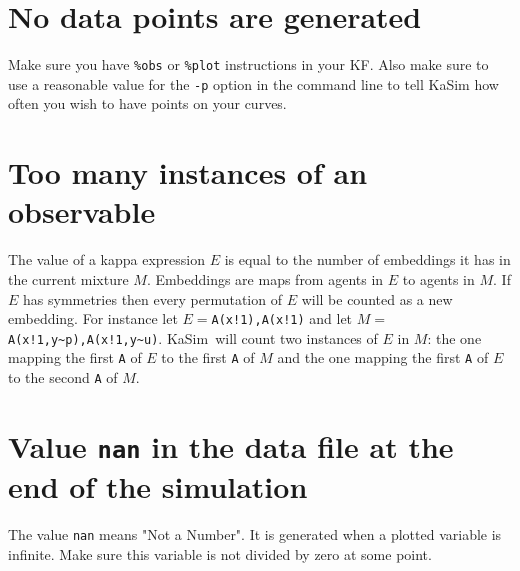 \documentclass[11pt]{book}
\def\KaSim{\textsf{KaSim}}
\def\intstate{\textasciitilde}
\def\ttt#1{\texttt{#1}}
\begin{document}
\section*{No data points are generated}
Make sure you have \ttt{\%obs} or \ttt{\%plot} instructions in your KF. Also make sure to use a reasonable value for the \ttt{-p} option in the command line to tell KaSim how often you wish to have points on your curves.

\section*{Too many instances of an observable}
The value of a kappa expression $E$  is equal to the number of embeddings it has in the current mixture $M$. Embeddings are maps from agents in $E$  to agents in $M$. If $E$ has symmetries then every permutation of $E$ will be counted as a new embedding. For instance let $E=$\ttt{A(x!1),A(x!1)}  and let $M=$\ttt{A(x!1,y\intstate p),A(x!1,y\intstate u)}.
\KaSim~will count two instances of $E$ in $M$: the one mapping the first \ttt{A} of $E$ to the first \ttt{A} of $M$ and the one mapping the first \ttt{A} of $E$ to the second \ttt{A} of $M$.


\section*{Value \ttt{nan} in the data file at the end of the simulation}
The value \ttt{nan} means "Not a Number". It is generated when a plotted variable is infinite. Make sure this variable is not divided by zero at some point.




\printindex
\end{document}
